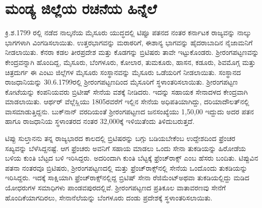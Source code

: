 \section*{ಮಂಡ್ಯ ಜಿಲ್ಲೆಯ ರಚನೆಯ ಹಿನ್ನೆಲೆ}

ಕ್ರಿ.ಶ.1799 ರಲ್ಲಿ ನಡೆದ ನಾಲ್ಕನೆಯ ಮೈಸೂರು ಯುದ್ಧದಲ್ಲಿ ಟಿಪ್ಪೂ ಪತನದ ನಂತರ ಕರ್ನಾಟಕ ರಾಜ್ಯವನ್ನು ನಾಲ್ಕು ಭಾಗಗಳಾಗಿ ವಿಂಗಡಿಸಲಾಯಿತು. ಉತ್ತರಭಾಗವನ್ನು ಮರಾಠರಿಗೆ, ಈಶಾನ್ಯ ಭಾಗವನ್ನು ಹೈದರಾಬಾದಿನ ನೈಜಾಮನಿಗೆ ನೀಡಲಾಯಿತು. ಕೆನರಾ ಕಡಲ ತೀರಪ್ರದೇಶ ಮತ್ತು ಕೊಡಗನ್ನು ಬ್ರಿಟಿಷರು ತಾವೇ ಇಟ್ಟುಕೊಂಡರು. ಶ‍್ರೀರಂಗಪಟ್ಟಣವನ್ನು ಕೇಂದ್ರವನ್ನಾಗಿ ಹೊಂದಿದ್ದ, ಮೈಸೂರು, ಬೆಂಗಳೂರು, ಕೋಲಾರ, ತುಮಕೂರು, ಹಾಸನ, ಕಡೂರು, ಶಿವಮೊಗ್ಗ ಮತ್ತು ಚಿತ್ರದುರ್ಗ ಈ ಎಂಟು ಜಿಲ್ಲೆಗಳ ಮೈಸೂರು ಸಂಸ್ಥಾನವನ್ನು ಮೈಸೂರು ಒಡೆಯರಿಗೆ ನೀಡಲಾಯಿತು. ಸಂಸ್ಥಾನದ ರಾಜಧಾನಿಯನ್ನು 30.6.1799ರಲ್ಲಿ ಶ‍್ರೀರಂಗಪಟ್ಟಣದಿಂದ ಮೈಸೂರಿಗೆ ಸ್ಥಳಾಂತರಿಸಲಾಯಿತು. ಶ‍್ರೀರಂಗಪಟ್ಟಣ ಕೋಟೆಯನ್ನು ಕಂಪನಿಯವರು ಬ್ರಿಟೀಷ್​ ಸೇನೆಯ ವಶಕ್ಕೆ ನೀಡಿದರು. ಇದನ್ನು ಸಹಾಯಕ ಸೇನಾದಳದ ಕೇಂದ್ರವಾಗಿ ಮಾಡಲಾಯಿತು. ಆರ್ಥರ್​ ವೆಲ್ಲೆಸ್ಲಿಯು 1805ರವರೆಗೆ ಇಲ್ಲಿನ ಸೇನೆಯ ಅಧಿಪತಿಯಾಗಿದ್ದು, ದರಿಯಾದೌಲತ್​ನಲ್ಲಿ ವಾಸಮಾಡುತ್ತಿದ್ದನು. ಬುಕ್​ನಾನ್​ ವರದಿಯಂತೆ ಶ‍್ರೀರಂಗಪಟ್ಟಣದ ಜನಸಂಖ್ಯೆಯು 1,50,00 ಇದ್ದುದು ಅದರ ಪತನ ಹಾಗೂ ರಾಜಧಾನಿಯ ಸ್ಥಳಾಂತರದ ನಂತರ 32,000ಕ್ಕೆ ಇಳಿಯಿತೆಂದು ತಿಳಿದುಬರುತ್ತದೆ.

\newpage

ಟಿಪ್ಪು ಸುಲ್ತಾನನು ತನ್ನ ರಾಜ್ಯಭಾರದ ಕಾಲದಲ್ಲಿ ಬ್ರಿಟಿಷರನ್ನು ಬಗ್ಗು ಬಡಿಯಬೇಕೆಂಬ ಉದ್ದೇಶದಿಂದ ಫ್ರೆಂಚರ ಸಖ್ಯವನ್ನು ಬೆಳೆಸಿದ್ದನಷ್ಟೆ. ಆಗ ಫ್ರೆಂಚರು ಅವನಿಗೆ ಸಹಾಯ ಮಾಡಲು ಒಂದು ಸೇನಾ ತುಕಡಿಯನ್ನು ಹಿರೋಡೆಯ ಬಳಿಯ ಕುಂತಿ ಬೆಟ್ಟದ ಬಳಿ ಇರಿಸಿದ್ದರು. ಅದರಿಂದಾಗಿ ಕುಂತಿ ಬೆಟ್ಟಕ್ಕೆ ಫ್ರೆಂಚ್​ರಾಕ್ಸ್​ ಎಂಬ ಹೆಸರು ಬಂದಿತು. ಟಿಪ್ಪುವಿನ ಪತನಾ ನಂತರವೂ ಬ್ರಿಟಿಷರು, ಶ‍್ರೀರಂಗಪಟ್ಟಣದಲ್ಲಿ ಮತ್ತು ಫ್ರೆಂಚ್​ರಾಕ್ಸ್​ನಲ್ಲಿ ಸೇನೆಯ ಒಂದೊಂದು ತುಕಡಿಯನ್ನು ಇರಿಸಿದ್ದರು. ಇದಕ್ಕೆ ಸಾಕ್ಷಿಯಾಗಿ ಫ್ರೆಂಚ್​ರಾಕ್ಸ್​ನಲ್ಲಿದ್ದ ಬ್ರಿಟಿಷ್​ ಸೇನಾ ರೆಜಿಮೆಂಟ್​ ಅಥವಾ ತುಕಡಿಯಲ್ಲಿದ್ದು ಮಡಿದ ಯೋಧರುಗಳ ಸಮಾಧಿಗಳು ಪಾಂಡವಪುರದಲ್ಲಿವೆ. ಶ‍್ರೀರಂಗಪಟ್ಟಣದ ಪ್ರತಿಕೂಲ ವಾತಾವರಣವು ಸೇನೆಗೆ ಹೊಂದಿಕೆಯಾಗದಿರಲು, ಸೇನಾನೆಲೆಯನ್ನು ಬೆಂಗಳೂರು ದಂಡು ಪ್ರದೇಶಕ್ಕೆ ಸ್ಥಳಾಂತರಿಸಲಾಯಿತು.

